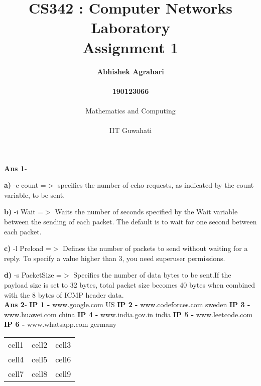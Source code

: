 \documentclass[12pt]{article}
\title{CS342 : Computer Networks Laboratory\\Assignment 1}
\date{}
\author{\LARGE\textbf{Abhishek Agrahari}\\\\\LARGE\textbf{190123066}\\\\Mathematics and Computing\\\\IIT Guwahati}
\begin{document}
\newpage
\maketitle
\clearpage

\bgroup\obeylines
\textbf{Ans 1}-

\textbf{a)} -c count =$>$ specifies the number of echo requests, as indicated by the count variable, to be sent.

\textbf{b)} -i Wait =$>$ Waits the number of seconds specified by the Wait variable between the sending of each packet. The default is to wait for one second between each packet.

\textbf{c)} -l Preload =$>$ Defines the number of packets to send without waiting for a reply. To specify a value higher than 3, you need superuser permissions.

\textbf{d)} -s PacketSize =$>$ Specifies the number of data bytes to be sent.If the payload size is set to 32 bytes, total packet size becomes 40 bytes when combined with the 8 bytes of ICMP header data.\\

\textbf{Ans 2}-
\textbf{IP 1 -} www.google.com US 
\textbf{IP 2 -} www.codeforces.com sweden
\textbf{IP 3 -} www.huawei.com china
\textbf{IP 4 -} www.india.gov.in india
\textbf{IP 5 -} www.leetcode.com  
\textbf{IP 6 -} www.whatsapp.com germany
\egroup
\begin{center}
\begin{tabular}{ |c|c|c| } 
 \hline
 cell1 & cell2 & cell3 \\ 
 cell4 & cell5 & cell6 \\ 
 cell7 & cell8 & cell9 \\ 
 \hline
\end{tabular}
\end{center}
\end{document}
